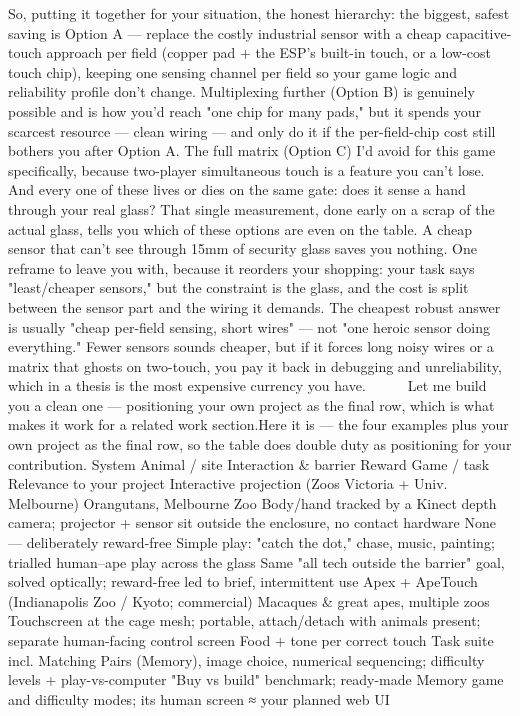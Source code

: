 So, putting it together for your situation, the honest hierarchy: the biggest, safest saving is Option A — replace the costly industrial sensor with a cheap capacitive-touch approach per field (copper pad + the ESP's built-in touch, or a low-cost touch chip), keeping one sensing channel per field so your game logic and reliability profile don't change. Multiplexing further (Option B) is genuinely possible and is how you'd reach "one chip for many pads," but it spends your scarcest resource — clean wiring — and only do it if the per-field-chip cost still bothers you after Option A. The full matrix (Option C) I'd avoid for this game specifically, because two-player simultaneous touch is a feature you can't lose.
And every one of these lives or dies on the same gate: does it sense a hand through your real glass? That single measurement, done early on a scrap of the actual glass, tells you which of these options are even on the table. A cheap sensor that can't see through 15mm of security glass saves you nothing.
One reframe to leave you with, because it reorders your shopping: your task says "least/cheaper sensors," but the constraint is the glass, and the cost is split between the sensor part and the wiring it demands. The cheapest robust answer is usually "cheap per-field sensing, short wires" — not "one heroic sensor doing everything." Fewer sensors sounds cheaper, but if it forces long noisy wires or a matrix that ghosts on two-touch, you pay it back in debugging and unreliability, which in a thesis is the most expensive currency you have.
 
 
Let me build you a clean one — positioning your own project as the final row, which is what makes it work for a related work section.Here it is — the four examples plus your own project as the final row, so the table does double duty as positioning for your contribution.
System	Animal / site	Interaction & barrier	Reward	Game / task	Relevance to your project
Interactive projection (Zoos Victoria + Univ. Melbourne)	Orangutans, Melbourne Zoo	Body/hand tracked by a Kinect depth camera; projector + sensor sit outside the enclosure, no contact hardware	None — deliberately reward-free	Simple play: "catch the dot," chase, music, painting; trialled human–ape play across the glass	Same "all tech outside the barrier" goal, solved optically; reward-free led to brief, intermittent use
Apex + ApeTouch (Indianapolis Zoo / Kyoto; commercial)	Macaques & great apes, multiple zoos	Touchscreen at the cage mesh; portable, attach/detach with animals present; separate human-facing control screen	Food + tone per correct touch	Task suite incl. Matching Pairs (Memory), image choice, numerical sequencing; difficulty levels + play-vs-computer	"Buy vs build" benchmark; ready-made Memory game and difficulty modes; its human screen ≈ your planned web UI

